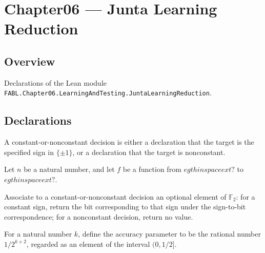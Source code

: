 \chapter{Chapter06 — Junta Learning Reduction}
\section{Overview}

Declarations of the Lean module \texttt{FABL.Chapter06.LearningAndTesting.JuntaLearningReduction}.

\section{Declarations}

\begin{definition}
\label{FABL.JuntaConstantDecision}
\leanok
{}
A constant-or-nonconstant decision is either a declaration that the target is the
specified sign in $\{\pm1\}$, or a declaration that the target is nonconstant.
\end{definition}

\begin{definition}
\label{FABL.JuntaConstantDecision.IsCorrect}
\leanok
{}
Let $n$ be a natural number, and let $f$ be a function from $
egthinspace	ext{?}$ to $
egthinspace	ext{?}$.
\end{definition}

\begin{definition}
\leanok
{}
Associate to a constant-or-nonconstant decision an optional element of $\mathbb F_2$:
for a constant sign, return the bit corresponding to that sign under the sign-to-bit
correspondence; for a nonconstant decision, return no value.
\end{definition}

\begin{definition}
\label{FABL.juntaConstantAccuracy}
\leanok
{}
For a natural number $k$, define the accuracy parameter to be the rational number
$1/2^{k+2}$, regarded as an element of the interval $(0,1/2]$.
\end{definition}

